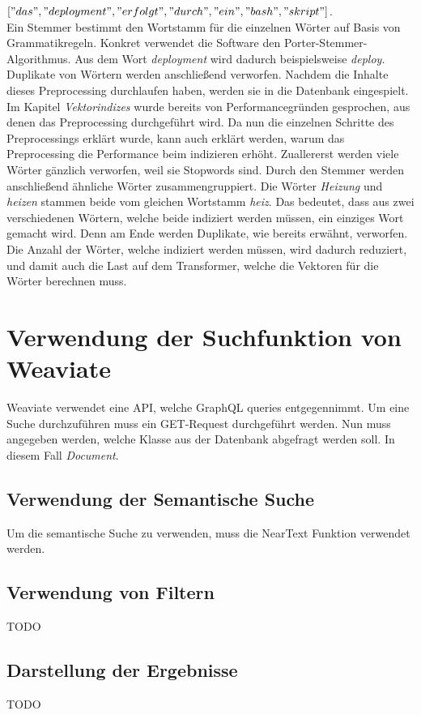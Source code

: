 \(["das", "deployment", "erfolgt", "durch", "ein", "bash", "skript"]\).\\

Ein Stemmer bestimmt den Wortstamm für die einzelnen Wörter auf Basis von Grammatikregeln.
Konkret verwendet die Software den Porter-Stemmer-Algorithmus.
Aus dem Wort \textit{deployment} wird dadurch beispielsweise \textit{deploy}.
Duplikate von Wörtern werden anschließend verworfen.
Nachdem die Inhalte dieses Preprocessing durchlaufen haben, werden sie in die Datenbank eingespielt.\\

Im Kapitel \textit{Vektorindizes} wurde bereits von Performancegründen gesprochen, aus denen das Preprocessing durchgeführt wird.
Da nun die einzelnen Schritte des Preprocessings erklärt wurde, kann auch erklärt werden, warum das Preprocessing die Performance beim indizieren erhöht.
Zuallererst werden viele Wörter gänzlich verworfen, weil sie Stopwords sind.
Durch den Stemmer werden anschließend ähnliche Wörter zusammengruppiert.
Die Wörter \textit{Heizung} und \textit{heizen} stammen beide vom gleichen Wortstamm \textit{heiz}.
Das bedeutet, dass aus zwei verschiedenen Wörtern, welche beide indiziert werden müssen, ein einziges Wort gemacht wird.
Denn am Ende werden Duplikate, wie bereits erwähnt, verworfen.
Die Anzahl der Wörter, welche indiziert werden müssen, wird dadurch reduziert, und damit auch die Last auf dem Transformer, welche die Vektoren für die Wörter berechnen muss.

\section{Verwendung der Suchfunktion von Weaviate}
Weaviate verwendet eine API, welche GraphQL queries entgegennimmt.
Um eine Suche durchzuführen muss ein GET-Request durchgeführt werden.
Nun muss angegeben werden, welche Klasse aus der Datenbank abgefragt werden soll.
In diesem Fall \textit{Document}.

\subsection{Verwendung der Semantische Suche}
Um die semantische Suche zu verwenden, muss die NearText Funktion verwendet werden.

\subsection{Verwendung von Filtern}
TODO

\subsection{Darstellung der Ergebnisse}
TODO